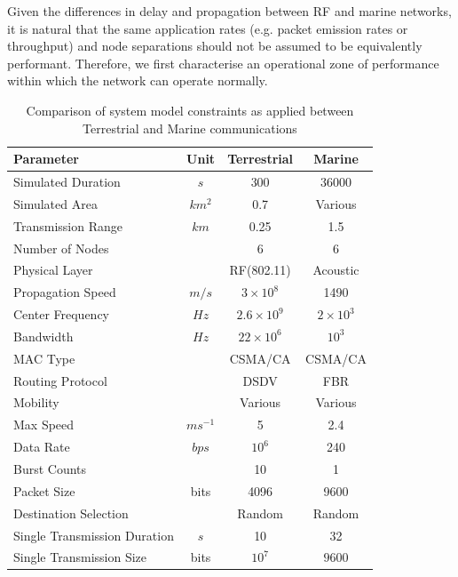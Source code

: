 \documentclass[runningheads,a4paper]{llncs}
\begin{document}
Given the differences in delay and propagation between RF and marine networks, it is natural that the same application rates (e.g. packet emission rates or throughput) and node separations should not be assumed to be equivalently performant.
Therefore, we first characterise an operational zone of performance within which the network can operate normally.

\begin{table}[h]
  \caption{Comparison of system model constraints as applied between Terrestrial and Marine communications} \label{tab:sysconstraints}
  \begin{center}
    \setlength{\tabcolsep}{8pt}
    \begin{tabular}{lccc}
      \toprule
      Parameter & Unit & Terrestrial & Marine \\
      \midrule
      Simulated Duration & $s$ & 300 & 36000\\
      Simulated Area & $km^2$ & 0.7 & Various \\
      Transmission Range & $km$ & 0.25 & 1.5 \\
      Number of Nodes & & 6 & 6 \\
      Physical Layer & & RF(802.11) & Acoustic\\
      Propagation Speed& $m/s$ & $3\times10^8$ & 1490\\
      Center Frequency& $Hz$ & $2.6\times10^9$ & $2 \times 10^3$ \\
      Bandwidth& $Hz$ & $22\times10^6$ & $10^3$\\
      MAC Type & & CSMA/CA & CSMA/CA\\
      Routing Protocol & & DSDV & FBR \\
      Mobility & & Various & Various \\
      Max Speed & $ms^{-1}$ & 5 & 2.4 \\
      Data Rate & $bps$ & $10^6$ & 240 \\
      Burst Counts & & 10 & 1 \\
      Packet Size & bits & 4096 &  9600 \\
      Destination Selection & & Random & Random\\
      Single Transmission Duration & $s$ & 10 & 32 \\
      Single Transmission Size & bits & $10^7$ & $9600$ \\
      \bottomrule
    \end{tabular}
    \setlength{\tabcolsep}{6pt}
  \end{center}
\end{table}
\end{document}
